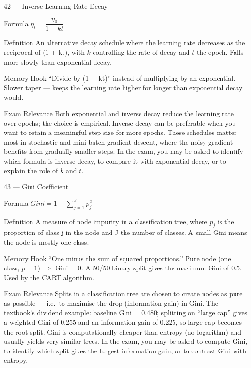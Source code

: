 \documentclass[aspectratio=169,8pt]{beamer}
\begin{document}
	\begin{frame}{42 --- Inverse Learning Rate Decay}
		\begin{block}{Formula}
			$\eta_t = \dfrac{\eta_0}{1 + kt}$
		\end{block}
		\begin{block}{Definition}
			An alternative decay schedule where the learning rate decreases as the reciprocal of (1 + kt), with $k$ controlling the rate of decay and $t$ the epoch. Falls more slowly than exponential decay.
		\end{block}
		\begin{block}{Memory Hook}
			``Divide by (1 + kt)'' instead of multiplying by an exponential. Slower taper --- keeps the learning rate higher for longer than exponential decay would.
		\end{block}
		\begin{block}{Exam Relevance}
			Both exponential and inverse decay reduce the learning rate over epochs; the choice is empirical. Inverse decay can be preferable when you want to retain a meaningful step size for more epochs. These schedules matter most in stochastic and mini-batch gradient descent, where the noisy gradient benefits from gradually smaller steps. In the exam, you may be asked to identify which formula is inverse decay, to compare it with exponential decay, or to explain the role of $k$ and $t$.
		\end{block}
	\end{frame}
	
	\begin{frame}{43 --- Gini Coefficient}
		\begin{block}{Formula}
			$Gini = 1 - \sum_{j=1}^{J} p_j^2$
		\end{block}
		\begin{block}{Definition}
			A measure of node impurity in a classification tree, where $p_j$ is the proportion of class j in the node and J the number of classes. A small Gini means the node is mostly one class.
		\end{block}
		\begin{block}{Memory Hook}
			``One minus the sum of squared proportions.'' Pure node (one class, $p = 1$) $\Rightarrow$ Gini = 0. A 50/50 binary split gives the maximum Gini of 0.5. Used by the CART algorithm.
		\end{block}
		\begin{block}{Exam Relevance}
			Splits in a classification tree are chosen to create nodes as pure as possible --- i.e.\ to maximise the drop (information gain) in Gini. The textbook's dividend example: baseline Gini = 0.480; splitting on ``large cap'' gives a weighted Gini of 0.255 and an information gain of 0.225, so large cap becomes the root split. Gini is computationally cheaper than entropy (no logarithm) and usually yields very similar trees. In the exam, you may be asked to compute Gini, to identify which split gives the largest information gain, or to contrast Gini with entropy.
		\end{block}
	\end{frame}
	
\end{document}
